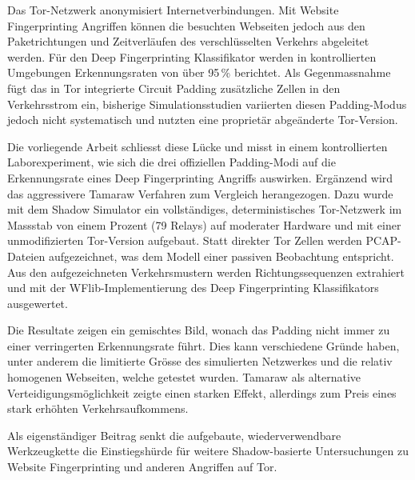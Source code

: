 \documentclass[german,bachelor]{hsluthesis}
\begin{document}
\maketitle


\begin{abstractstyle}{\hsummary}
Das Tor-Netzwerk anonymisiert Internetverbindungen. Mit Website Fingerprinting Angriffen können die besuchten Webseiten jedoch aus den Paketrichtungen und Zeitverläufen des verschlüsselten Verkehrs abgeleitet werden.
Für den Deep Fingerprinting Klassifikator werden in kontrollierten Umgebungen Erkennungsraten von über 95\,\% berichtet.
Als Gegenmassnahme fügt das in Tor integrierte Circuit Padding zusätzliche Zellen in den Verkehrsstrom ein, bisherige Simulations\-studien variierten diesen Padding-Modus jedoch nicht systematisch und nutzten eine proprietär abgeänderte Tor-Version.

Die vorliegende Arbeit schliesst diese Lücke und misst in einem kontrollierten Laborexperiment, wie sich die drei offiziellen Padding-Modi auf die Erkennungsrate eines Deep Fingerprinting Angriffs auswirken.
Ergänzend wird das aggressivere Tamaraw Verfahren zum Vergleich herangezogen.
Dazu wurde mit dem Shadow Simulator ein vollständiges, deterministisches Tor-Netzwerk im Massstab von einem Prozent (79 Relays) auf moderater Hardware und mit einer unmodifizierten Tor-Version aufgebaut.
Statt direkter Tor Zellen werden PCAP-Dateien aufgezeichnet, was dem Modell einer passiven Beobachtung entspricht.
Aus den aufgezeichneten Verkehrsmustern werden Richtungssequenzen extrahiert und mit der WFlib-Implementierung des Deep Fingerprinting Klassifikators ausgewertet.

Die Resultate zeigen ein gemischtes Bild, wonach das Padding nicht immer zu einer verringerten Erkennungsrate führt.
Dies kann verschiedene Gründe haben, unter anderem die limitierte Grösse des simulierten Netzwerkes und die relativ homogenen Webseiten, welche getestet wurden.
Tamaraw als alternative Verteidigungsmöglichkeit zeigte einen starken Effekt, allerdings zum Preis eines stark erhöhten Verkehrsaufkommens.

Als eigenständiger Beitrag senkt die aufgebaute, wiederverwendbare Werkzeugkette die Einstiegshürde für weitere Shadow-basierte Untersuchungen zu Website Fingerprinting und anderen Angriffen auf Tor.
\end{abstractstyle}
\glsresetall
\end{document}
